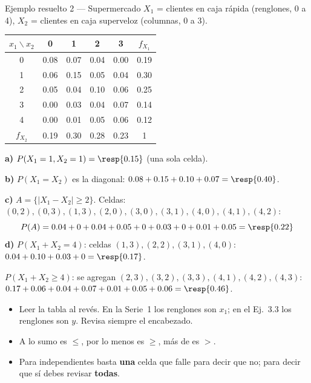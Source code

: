 \begin{ejemplo}{Ejemplo resuelto 2 --- Supermercado }
$X_1$ = clientes en caja r\'apida (renglones, 0 a 4), $X_2$ = clientes en caja superveloz (columnas, 0 a 3).
\begin{center}\small
\begin{tabular}{c|cccc|c}
$x_1\backslash x_2$ & 0 & 1 & 2 & 3 & $f_{X_1}$\\ \hline
0 & 0.08 & 0.07 & 0.04 & 0.00 & 0.19\\
1 & 0.06 & 0.15 & 0.05 & 0.04 & 0.30\\
2 & 0.05 & 0.04 & 0.10 & 0.06 & 0.25\\
3 & 0.00 & 0.03 & 0.04 & 0.07 & 0.14\\
4 & 0.00 & 0.01 & 0.05 & 0.06 & 0.12\\ \hline
$f_{X_2}$ & 0.19 & 0.30 & 0.28 & 0.23 & 1
\end{tabular}
\end{center}
\textbf{a)} $P(X_1=1,X_2=1)=\resp{0.15}$ (una sola celda).

\textbf{b)} $P(X_1=X_2)$ es la diagonal: $0.08+0.15+0.10+0.07=\resp{0.40}$.

\textbf{c)} $A=\{|X_1-X_2|\ge 2\}$. Celdas: $(0,2),(0,3),(1,3),(2,0),(3,0),(3,1),(4,0),(4,1),(4,2)$:
\[P(A)=0.04+0+0.04+0.05+0+0.03+0+0.01+0.05=\resp{0.22}\]
\textbf{d)} $P(X_1+X_2=4)$: celdas $(1,3),(2,2),(3,1),(4,0)$: $0.04+0.10+0.03+0=\resp{0.17}$.

$P(X_1+X_2\ge4)$: se agregan $(2,3),(3,2),(3,3),(4,1),(4,2),(4,3)$:
$0.17+0.06+0.04+0.07+0.01+0.05+0.06=\resp{0.46}$.
\end{ejemplo}

\begin{trampa}
\begin{itemize}
\item Leer la tabla al rev\'es. En la Serie~1 los renglones son $x_1$; en el Ej.~3.3 los renglones son $y$. Revisa siempre el encabezado.
\item \guillemotleft A lo sumo\guillemotright{} es $\le$, \guillemotleft por lo menos\guillemotright{} es $\ge$, \guillemotleft m\'as de\guillemotright{} es $>$.
\item Para \guillemotleft independientes\guillemotright{} basta \textbf{una} celda que falle para decir que no; para decir que s\'i debes revisar \textbf{todas}.
\end{itemize}
\end{trampa}

